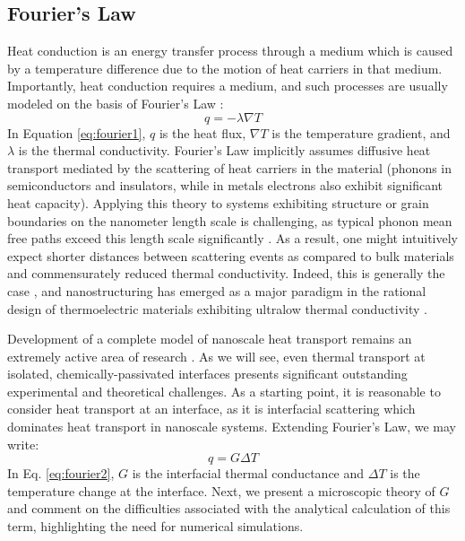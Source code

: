 \subsection{Fourier's Law}
Heat conduction is an energy transfer process through a medium which is caused by a temperature difference due to the motion of heat carriers in that medium. Importantly, heat conduction requires a medium, and such processes are usually modeled on the basis of Fourier's Law \cite{chen2000particularities}:
\begin{equation}\label{eq:fourier1}
q = -\lambda\nabla T
\end{equation}
In Equation \ref{eq:fourier1}, $q$ is the heat flux, $\nabla T$ is the temperature gradient, and $\lambda$ is the thermal conductivity. Fourier's Law implicitly assumes diffusive heat transport mediated by the scattering of heat carriers in the material (phonons in semiconductors and insulators, while in metals electrons also exhibit significant heat capacity). Applying this theory to systems exhibiting structure or grain boundaries on the nanometer length scale is challenging, as typical phonon mean free paths exceed this length scale significantly \cite{chen2000particularities, cahill2003nanoscale}. As a result, one might intuitively expect shorter distances between scattering events as compared to bulk materials and commensurately reduced thermal conductivity. Indeed, this is generally the case \cite{cahill2003nanoscale}, and nanostructuring has emerged as a major paradigm in the rational design of thermoelectric materials exhibiting ultralow thermal conductivity \cite{doi:10.1021/cm902195j, Hsu06022004}. \par
Development of a complete model of nanoscale heat transport remains an extremely active area of research \cite{cahill2014nanoscale, france2014atomistic, merabia2014thermal, maznev2015boundary}. As we will see, even thermal transport at isolated, chemically-passivated interfaces presents significant outstanding experimental and theoretical challenges. As a starting point, it is reasonable to consider heat transport at an interface, as it is interfacial scattering which dominates heat transport in nanoscale systems. Extending Fourier's Law, we may write:
\begin{equation}\label{eq:fourier2}
q = G\Delta T
\end{equation}
In Eq. \ref{eq:fourier2}, $G$ is the interfacial thermal conductance and $\Delta T$ is the temperature change at the interface. Next, we present a microscopic theory of $G$ and comment on the difficulties associated with the analytical calculation of this term, highlighting the need for numerical simulations.

